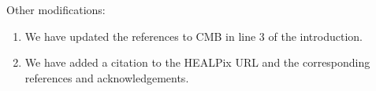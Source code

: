 \documentclass[a4paper]{article}
\begin{document}
Other modifications:
\begin{enumerate}
  \item We have updated the references to CMB in line 3 of the introduction.
  \item We have added a citation to the HEALPix URL and the corresponding references and acknowledgements.
\end{enumerate}
\end{document}
